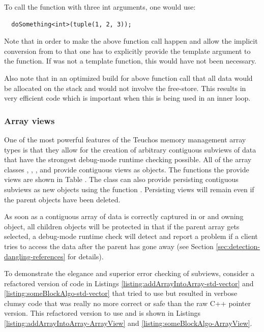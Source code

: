 \documentclass[pdf,ps2pdf,11pt]{SANDreport}
\begin{document}
To call the function with three int arguments, one would use:

{\small\begin{verbatim}
  doSomething<int>(tuple(1, 2, 3));
\end{verbatim}}

Note that in order to make the above function call happen and allow
the implicit conversion from {} to
{} that one has to explicitly provide the
template argument to the {} function.  If
{} was not a template function, this would have not
been necessary.

Also note that in an optimized build for above function call that all
data would be allocated on the stack and would not involve the
free-store.  This results in very efficient code which is important
when this is being used in an inner loop.


%
{}\subsubsection{Array views}
\label{sec:array-views}
%

One of the most powerful features of the Teuchos memory management
array types is that they allow for the creation of arbitrary
contiguous subviews of data that have the strongest debug-mode runtime
checking possible.  All of the array classes {},
{}, {}, and {} provide
contiguous views as {} objects.  The functions the
provide {} views are shown in Table
{}.  The {}
class can also provide persisting contiguous subviews as new
{} objects using the function
{}.  Persisting views will
remain even if the parent {} objects have been deleted.

As soon as a contiguous array of data is correctly captured in
{} or and owning {} object, all
children {} objects will be protected in that if the
parent array gets selected, a debug-mode runtime check will detect and
report a problem if a client tries to access the data after the parent
has gone away (see Section {}\ref{sec:detection-dangling-references}
for details).

To demonstrate the elegance and superior error checking of
{} subviews, consider a refactored version of code
in Listings {}\ref{listing:addArrayIntoArray-std-vector} and
{}\ref{listing:someBlockAlgo-std-vector} that tried to use
{} but resulted in verbose clumsy code that was
really no more correct or safe than the raw C++ pointer version.  This
refactored version to use {} and {} is
shown in Listings {}\ref{listing:addArrayIntoArray-ArrayView} and
{}\ref{listing:someBlockAlgo-ArrayView}.
\end{document}
